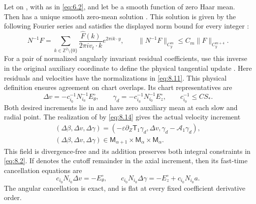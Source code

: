 \begin{lemma}\label{lem:8.6}
Let  on , with
 as in \eqref{eq:6.2}, and let  be a smooth function
of zero Haar mean. Then  has a unique smooth zero-mean solution
. This solution is given by the following Fourier series and
satisfies the displayed norm bound for every integer :
\begin{equation}
N^{-1}F=\sum_{k\in\mathbb Z^2\setminus\{0\}}
\frac{\widehat F(k)}{2\pi i v_t\cdot k}e^{2\pi i k\cdot y},
\qquad
\|N^{-1}F\|_{C_y^m}\le C_m\|F\|_{C_y^{m+4}}.
\tag{8.19}\label{eq:8.19}
\end{equation}
For a pair  of normalized angularly invariant
residual coefficients, use this inverse in the original auxiliary coordinate
 to define the physical tangential update
. Here
%
residuals and velocities have the normalizations in \eqref{eq:8.11}. This physical definition ensures
agreement on chart overlaps. Its chart representatives are
\begin{equation}
\Delta v=-c_{i_0}^{-1}N_{i_0}^{-1}E_\theta^\circ,
\qquad
\gamma_d=-c_{i_0}^{-1}N_{i_0}^{-1}E_z^\circ,
\qquad
c_{i_0}^{-1}\le CS_*.
\tag{8.20}\label{eq:8.20}
\end{equation}
Both desired increments  lie in
 and have zero auxiliary mean at each slow and radial point.
The realization of  by \eqref{eq:8.14} gives the actual velocity
increment
\begin{equation}
\begin{gathered}
(\Delta\beta,\Delta v,\Delta\gamma)
=(-\varepsilon\partial_Z\mathsf T_1\gamma_d,\Delta v,\gamma_d-\mathcal A_1\gamma_d),\\
(\Delta\beta,\Delta v,\Delta\gamma)
\in \mathsf M_{\alpha+1}\times \mathsf M_\alpha\times \mathsf M_\alpha.
\end{gathered}
\tag{8.21}\label{eq:8.21}
\end{equation}
This field is divergence-free and its addition preserves both integral constraints in \eqref{eq:8.2}.
If  denotes the cutoff remainder in the axial
increment, then its fast-time cancellation equations are
\begin{equation}
c_{i_0}N_{i_0}\Delta v=-E_\theta^\circ,
\qquad
c_{i_0}N_{i_0}\Delta\gamma=-E_z^\circ+c_{i_0}N_{i_0}a.
\tag{8.22}\label{eq:8.22}
\end{equation}
The angular cancellation is exact, and  is flat at every fixed
coefficient derivative order.
\end{lemma}

